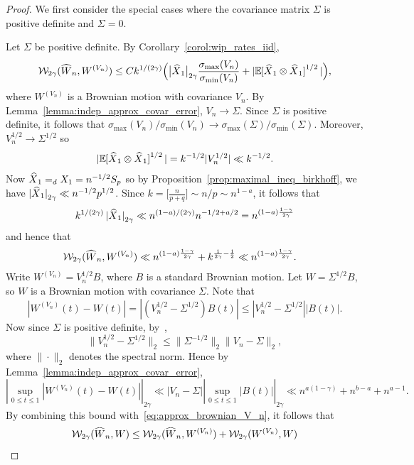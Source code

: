 \documentclass[11pt,a4paper,reqno,oneside]{amsart}
\newcommand{\pnorm}[1]{\left|#1\right|}
\newcommand{\eqd}{=_d}
\newcommand{\Ex}[2][]{\mathbb{E}_{#1\!\!}\left[#2\right]}
\newcommand{\wass}{\mathcal{W}}
\newcommand{\shat}[1]{\vphantom{#1}\smash[t]{\widehat{#1}}}
\theoremstyle{definition}
\theoremstyle{remark}
\numberwithin{equation}{section}
\begin{document}
\begin{proof}
	We first consider the special cases where the covariance matrix $\Sigma$ is positive definite and $\Sigma=0$.
	
	Let $\Sigma$ be positive definite. By Corollary~\ref{corol:wip_rates_iid}, 
	\begin{equation*}
		\wass_{2\gamma}(\shat W_n, W^{(V_n)})\le Ck^{1/(2\gamma)}\Big(\big|\shat X_1\big|_{2\gamma}\frac{\sigma_{\max}(V_n)}{\sigma_{\min}(V_n)}+|\Ex{\shat X_1 \otimes \shat X_1}^{1/2}|\Big),
	\end{equation*}
	where $ W^{(V_n)} $ is a Brownian motion with covariance $ V_n $. By Lemma~\ref{lemma:indep_approx_covar_error},  $ V_n \to \Sigma $. Since $ \Sigma $ is positive definite, it follows that $ \sigma_{\max}(V_n)/\sigma_{\min}(V_n)\to \sigma_{\max}(\Sigma)/\sigma_{\min}(\Sigma) $. Moreover, $ V_n^{1/2}\to \Sigma^{1/2} $ so 
	\[ |\Ex{\shat X_1 \otimes \shat X_1}^{1/2}|=k^{-1/2}|V_n^{1/2}|\ll k^{-1/2}. \]
	Now $ \shat X_1 \eqd X_1 = n^{-1/2}S_p $ so by Proposition~\ref{prop:maximal_ineq_birkhoff}, we have $ \pnorm{\shat X_1}_{2\gamma}\ll n^{-1/2}p^{1/2}$. 
	Since $ k=\big[\frac{n}{p+q}\big]\sim n/p\sim n^{1-a} $, it follows that 
	\begin{align}\label{eq:pnorm_sum_bd}
		k^{1/(2\gamma)}\pnorm{\shat X_1}_{2\gamma}\ll n^{(1-a)/(2\gamma)}n^{-1/2+a/2}=n^{(1-a)\frac{1-\gamma}{2\gamma}}
	\end{align}
	and hence that
	\begin{align}
		\wass_{2\gamma}(\shat W_n, W^{(V_n)})&\ll n^{(1-a)\frac{1-\gamma}{2\gamma}}+ k^{\frac{1}{2\gamma}-\frac{1}{2}}\ll n^{(1-a)\frac{1-\gamma}{2\gamma}}.\label{eq:approx_brownian_V_n}
	\end{align}
	Write $ W^{(V_n)}=V_n^{1/2}B $, where $ B $ is a standard Brownian motion. Let $ W=\Sigma^{1/2}B $, so $ W $ is a Brownian motion with covariance $ \Sigma $. Note that
	\[ |W^{(V_n)}(t)-W(t)|=|(V^{1/2}_n - \Sigma^{1/2})B(t)|\le |V^{1/2}_n - \Sigma^{1/2}||B(t)|. \]
	Now since $ \Sigma $ is positive definite, by~\cite[equation (7.2.13)]{horn_johnson}, 
	\[ \|V_n^{1/2}-\Sigma^{1/2}\|_2\le \|\Sigma^{-1/2}\|_2\|V_n - \Sigma\|_2,  \]
	where $ \|\cdot\|_2 $ denotes the spectral norm. Hence by Lemma~\ref{lemma:indep_approx_covar_error},
	\[ \pnorm{\sup_{0\le t\le 1}|W^{(V_n)}(t)-W(t)|}_{2\gamma}\ll |V_n - \Sigma|\pnorm{\sup_{0\le t\le 1}|B(t)|}_{2\gamma}\ll n^{a(1-\gamma)}+n^{b-a}+n^{a-1}. \]
	By combining this bound with~\eqref{eq:approx_brownian_V_n}, it follows that 
	\begin{align}
		\wass_{2\gamma}(\shat W_n, W)&\le \wass_{2\gamma}(\shat W_n, W^{(V_n)})+\wass_{2\gamma}(W^{(V_n)}, W)\nonumber\\

\end{align}
\end{proof}
\end{document}
